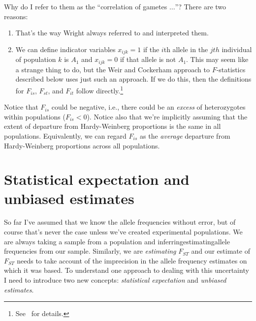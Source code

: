 Why do I refer to them as the ``correlation of gametes $\dots$''?
There are two reasons:

\begin{enumerate}

\item That's the way Wright always referred to and interpreted them.

\item We can define indicator variables $x_{ijk} = 1$ if the $i$th
  allele in the $jth$ individual of population $k$ is $A_1$ and
  $x_{ijk} = 0$ if that allele is not $A_1$. This may seem like a
  strange thing to do, but the Weir and Cockerham approach to
  $F$-statistics described below uses just such an approach. If we do
  this, then the definitions for $F_{is}$, $F_{st}$, and $F_{it}$
  follow directly.\footnote{See~\cite{Weir-1996} for details.}

\end{enumerate}

Notice that $F_{is}$ could be negative, i.e., there could be an {\it
  excess\/} of heterozygotes within populations ($F_{is} < 0$). Notice
also that we're implicitly assuming that the extent of departure from
Hardy-Weinberg proportions is the same in all
populations. Equivalently, we can regard $F_{is}$ as the {\it
  average\/} departure from Hardy-Weinberg proportions across all
populations.

\section*{Statistical expectation and unbiased
  estimates}

So far I've assumed that we know the allele frequencies without error,
but of course that's never the case unless we've created experimental
populations. We are always taking a sample from a population and
inferring{\dash}estimating{\dash}allele frequencies from our
sample. Similarly, we are {\it estimating\/} $F_{ST}$ and our estimate
of $F_{ST}$ needs to take account of the imprecision in the allele
frequency estimates on which it was based. To understand one approach
to dealing with this uncertainty I need to introduce two new concepts:
{\it statistical expectation\/} and {\it
  unbiased
estimates}.

